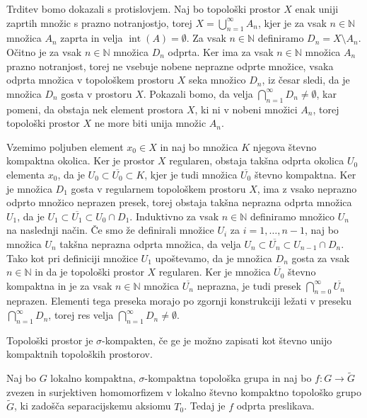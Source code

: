 \documentclass[mat1]{fmfdelo}
\newcommand{\N}{\mathbb N}
\newcommand{\closure}[1]{\overline{#1}}
\DeclareMathOperator{\interior}{int}
\begin{document}
\begin{dokaz}
Trditev bomo dokazali s protislovjem. Naj bo topološki prostor $X$ enak uniji zaprtih množic s prazno notranjostjo, torej $X = \bigcup_{n=1}^\infty A_n$, kjer je za vsak $n \in \N$ množica $A_n$ zaprta in velja $\interior(A) = \emptyset$. Za vsak $n \in \N$ definiramo $D_n = X \setminus A_n$. Očitno je za vsak $n \in \N$ množica $D_n$ odprta. Ker ima za vsak $n \in \N$ množica $A_n$ prazno notranjost, torej ne vsebuje nobene neprazne odprte množice, vsaka odprta množica v topološkem prostoru $X$ seka množico $D_n$, iz česar sledi, da je množica $D_n$ gosta v prostoru $X$. Pokazali bomo, da velja $\bigcap_{n=1}^\infty D_n \neq \emptyset$, kar pomeni, da obstaja nek element prostora $X$, ki ni v nobeni množici $A_n$, torej topološki prostor $X$ ne more biti unija množic $A_n$.

Vzemimo poljuben element $x_0 \in X$ in naj bo množica $K$ njegova števno kompaktna okolica. Ker je prostor $X$ regularen, obstaja takšna odprta okolica $U_0$ elementa $x_0$, da je $U_0 \subset \closure{U_0} \subset K$, kjer je tudi množica $\closure{U_0}$ števno kompaktna. Ker je množica $D_1$ gosta v regularnem topološkem prostoru $X$, ima z vsako neprazno odprto množico neprazen presek, torej obstaja takšna neprazna odprta množica $U_1$, da je $U_1 \subset \closure{U_1} \subset U_0 \cap D_1$. Induktivno za vsak $n \in \N$ definiramo množico $U_n$ na naslednji način. Če smo že definirali množice $U_i$ za $i = 1,\dots,n-1$, naj bo množica $U_n$ takšna neprazna odprta množica, da velja $U_n \subset \closure{U_n} \subset U_{n-1} \cap D_n$. Tako kot pri definiciji množice $U_1$ upoštevamo, da je množica $D_n$ gosta za vsak $n \in \N$ in da je topološki prostor $X$ regularen.
Ker je množica $\closure{U_0}$ števno kompaktna in je za vsak $n \in \N$ množica $\closure{U_n}$ neprazna, je tudi presek $\bigcap_{n=0}^\infty \closure{U_n}$ neprazen. Elementi tega preseka morajo po zgornji konstrukciji ležati v preseku $\bigcap_{n=1}^\infty D_n$, torej res velja $\bigcap_{n=1}^\infty D_n \neq \emptyset$.
\end{dokaz}

\begin{definicija}
Topološki prostor je $\sigma$-kompakten, če ge je možno zapisati kot števno unijo kompaktnih topoloških prostorov.
\end{definicija}

\begin{trditev}\label{trd:kompodp}
Naj bo $G$ lokalno kompaktna, $\sigma$-kompaktna topološka grupa in naj bo $f\colon G \to \widetilde{G}$ zvezen in surjektiven homomorfizem v lokalno števno kompaktno topološko grupo $\widetilde{G}$, ki zadošča separacijskemu aksiomu $T_0$. Tedaj je $f$ odprta preslikava.
\end{trditev}
\end{document}
